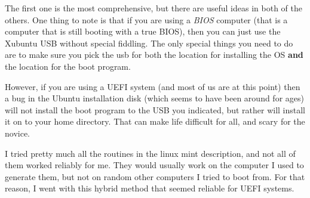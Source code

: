\documentclass{article}
\begin{document}
The first one is the most comprehensive, but there are useful ideas in both of the others. One thing to note is that if you are using a \emph{BIOS} computer (that is a computer that is still booting with a true BIOS), then you can just use the Xubuntu USB without special fiddling. The only special things you need to do are to make sure you pick the usb for both the location for installing the OS \textbf{and} the location for the boot program. 

However, if you are using a UEFI system (and most of us are at this point) then a bug in the Ubuntu installation disk (which seems to have been around for ages) will not install the boot program to the USB you indicated, but rather will install it on to your home directory. That can make life difficult for all, and scary for the novice. 

I tried pretty much all the routines in the linux mint description, and not all of them worked reliably for me. They would usually work on the computer I used to generate them, but not on random other computers I tried to boot from. For that reason, I went with this hybrid method that seemed reliable for UEFI systems.
\end{document}
